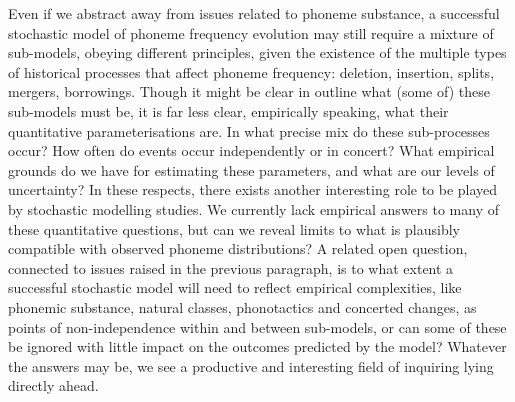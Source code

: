 Even if we abstract away from issues related to phoneme substance, a successful stochastic model of phoneme frequency evolution may still require a mixture of sub-models, obeying different principles, given the existence of the multiple types of historical processes that affect phoneme frequency: deletion, insertion, splits, mergers, borrowings. Though it might be clear in outline what (some of) these sub-models must be, it is far less clear, empirically speaking, what their quantitative parameterisations are. In what precise mix do these sub-processes occur? How often do events occur independently or in concert? What empirical grounds do we have for estimating these parameters, and what are our levels of uncertainty? In these respects, there exists another interesting role to be played by stochastic modelling studies. We currently lack empirical answers to many of these quantitative questions, but can we reveal limits to what is plausibly compatible with observed phoneme distributions? A related open question, connected to issues raised in the previous paragraph, is to what extent a successful stochastic model will need to reflect empirical complexities, like phonemic substance, natural classes, phonotactics and concerted changes, as points of non-independence within and between sub-models, or can some of these be ignored with little impact on the outcomes predicted by the model? Whatever the answers may be, we see a productive and interesting field of inquiring lying directly ahead.

